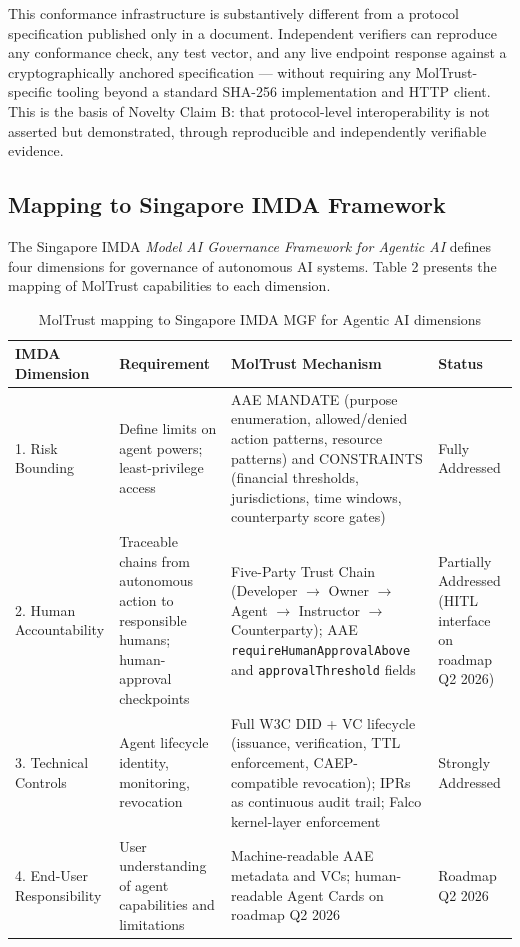 This conformance infrastructure is substantively different from a protocol specification published only in a document. Independent verifiers can reproduce any conformance check, any test vector, and any live endpoint response against a cryptographically anchored specification — without requiring any MolTrust-specific tooling beyond a standard SHA-256 implementation and HTTP client. This is the basis of Novelty Claim B: that protocol-level interoperability is not asserted but demonstrated, through reproducible and independently verifiable evidence.


\subsection{Mapping to Singapore IMDA Framework}

The Singapore IMDA \textit{Model AI Governance Framework for Agentic AI} \cite{ref8_imda} defines four dimensions for governance of autonomous AI systems. Table 2 presents the mapping of MolTrust capabilities to each dimension.




\begin{table}[!htbp]
\centering
\footnotesize
\renewcommand{\arraystretch}{1.15}
\caption{MolTrust mapping to Singapore IMDA MGF for Agentic AI dimensions}
\begin{tabular}{@{}p{2.5cm} p{5.0cm} p{5.0cm} p{2.1cm}@{}}
\toprule
IMDA Dimension & Requirement & MolTrust Mechanism & Status \\
\midrule
1. Risk Bounding & Define limits on agent powers; least-privilege access & AAE MANDATE (purpose enumeration, allowed/denied action patterns, resource patterns) and CONSTRAINTS (financial thresholds, jurisdictions, time windows, counterparty score gates) & Fully Addressed \\
2. Human Accountability & Traceable chains from autonomous action to responsible humans; human-approval checkpoints & Five-Party Trust Chain (Developer $\rightarrow$ Owner $\rightarrow$ Agent $\rightarrow$ Instructor $\rightarrow$ Counterparty); AAE \texttt{requireHumanApprovalAbove} and \texttt{approvalThreshold} fields & Partially Addressed (HITL interface on roadmap Q2 2026) \\
3. Technical Controls & Agent lifecycle identity, monitoring, revocation & Full W3C DID + VC lifecycle (issuance, verification, TTL enforcement, CAEP-compatible revocation); IPRs as continuous audit trail; Falco kernel-layer enforcement & Strongly Addressed \\
4. End-User Responsibility & User understanding of agent capabilities and limitations & Machine-readable AAE metadata and VCs; human-readable Agent Cards on roadmap Q2 2026 & Roadmap Q2 2026 \\
\bottomrule
\end{tabular}
\end{table}


